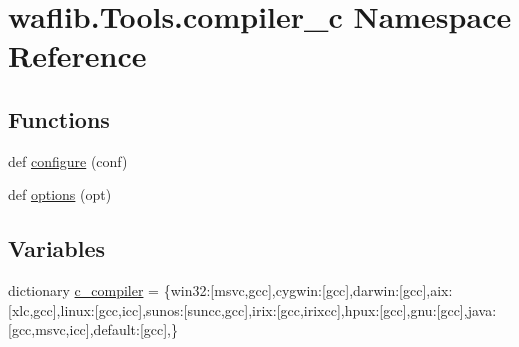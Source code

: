 \hypertarget{namespacewaflib_1_1_tools_1_1compiler__c}{}\section{waflib.\+Tools.\+compiler\+\_\+c Namespace Reference}
\label{namespacewaflib_1_1_tools_1_1compiler__c}
\subsection*{Functions}
\begin{DoxyCompactItemize}
\item 
def \hyperlink{namespacewaflib_1_1_tools_1_1compiler__c_a21492d9277532807d6c9af80d07ab9cd}{configure} (conf)
\item 
def \hyperlink{namespacewaflib_1_1_tools_1_1compiler__c_a3700f55375e0ba3c634ddfe42b019667}{options} (opt)
\end{DoxyCompactItemize}
\subsection*{Variables}
\begin{DoxyCompactItemize}
\item 
dictionary \hyperlink{namespacewaflib_1_1_tools_1_1compiler__c_af025fb02fdf9ddca8d52b092ba56d51b}{c\+\_\+compiler} = \{\textquotesingle{}win32\textquotesingle{}\+:\mbox{[}\textquotesingle{}msvc\textquotesingle{},\textquotesingle{}gcc\textquotesingle{}\mbox{]},\textquotesingle{}cygwin\textquotesingle{}\+:\mbox{[}\textquotesingle{}gcc\textquotesingle{}\mbox{]},\textquotesingle{}darwin\textquotesingle{}\+:\mbox{[}\textquotesingle{}gcc\textquotesingle{}\mbox{]},\textquotesingle{}aix\textquotesingle{}\+:\mbox{[}\textquotesingle{}xlc\textquotesingle{},\textquotesingle{}gcc\textquotesingle{}\mbox{]},\textquotesingle{}linux\textquotesingle{}\+:\mbox{[}\textquotesingle{}gcc\textquotesingle{},\textquotesingle{}icc\textquotesingle{}\mbox{]},\textquotesingle{}sunos\textquotesingle{}\+:\mbox{[}\textquotesingle{}suncc\textquotesingle{},\textquotesingle{}gcc\textquotesingle{}\mbox{]},\textquotesingle{}irix\textquotesingle{}\+:\mbox{[}\textquotesingle{}gcc\textquotesingle{},\textquotesingle{}irixcc\textquotesingle{}\mbox{]},\textquotesingle{}hpux\textquotesingle{}\+:\mbox{[}\textquotesingle{}gcc\textquotesingle{}\mbox{]},\textquotesingle{}gnu\textquotesingle{}\+:\mbox{[}\textquotesingle{}gcc\textquotesingle{}\mbox{]},\textquotesingle{}java\textquotesingle{}\+:\mbox{[}\textquotesingle{}gcc\textquotesingle{},\textquotesingle{}msvc\textquotesingle{},\textquotesingle{}icc\textquotesingle{}\mbox{]},\textquotesingle{}default\textquotesingle{}\+:\mbox{[}\textquotesingle{}gcc\textquotesingle{}\mbox{]},\}
\end{DoxyCompactItemize}


